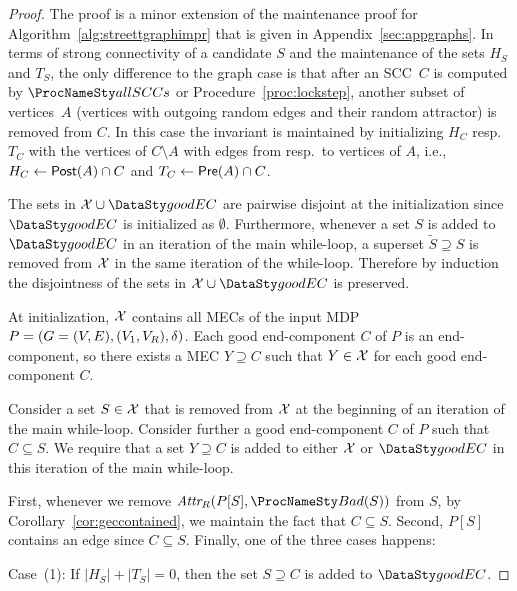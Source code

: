 \begin{proof}
\item 
\smallskip{}
The proof is a minor extension of the maintenance proof for Algorithm~\ref{alg:streettgraphimpr}
that is given in Appendix~\ref{sec:appgraphs}. In terms of strong connectivity of a candidate $S$
and the maintenance of the sets $H_S$ and $T_S$, the only difference to the graph case is that
after an SCC~$C$ is computed by $\sccalg$ or Procedure~\ref{proc:lockstep}, another subset
of vertices~$A$ (vertices with outgoing random edges and their random attractor) is removed
from $C$. In this case the invariant is maintained by initializing $H_C$ resp.\ $T_C$ with 
the vertices of $C \setminus A$ with edges from resp.\ to vertices of $A$, i.e., 
$H_C \gets \mathsf{Post}(A) \cap C$ and $T_C \gets \mathsf{Pre}(A) \cap C$.

\smallskip{}
The sets in $\mathcal{\ec} \cup \good$ are pairwise disjoint at the
initialization since $\good$ is initialized as $\emptyset$. Furthermore,
whenever a set $S$ is added to $\good$ in an iteration of the main
while-loop, a superset $\tilde{S} \supseteq S$ is removed from
$\mathcal{X}$ in the same iteration of the while-loop. Therefore
by induction the disjointness of the sets in $\mathcal{\ec} \cup \good$
is preserved.

\smallskip{}
At initialization, $\mathcal{X}$ contains all MECs of the input MDP
$P = (G = (V, E), \allowbreak(V_1, V_R), \allowbreak\delta)$.
Each good end-component $C$ of $P$ is an end-component, 
so there exists a MEC $Y \supseteq C$ such that $Y \in \mathcal{X}$
for each good end-component $C$.

Consider a set $S \in \mathcal{X}$ that is removed from $\mathcal{X}$
at the beginning of an iteration of the main while-loop. Consider further
a good end-component $C$ of $P$ such that $C \subseteq S$. We require that a set
$Y \supseteq C$ is added to either
$\mathcal{X}$ or $\good$ in this iteration of the main while-loop.

First, whenever we remove $\at{R}{\mdp[S]}{\bad(S)}$ from $S$, by Corollary~\ref{cor:geccontained},
we maintain the fact that $C \subseteq S$. Second, $P[S]$ contains an edge since $C \subseteq S$.
Finally, one of the three cases happens:

\smallskip\noindent Case~(1): If $\lvert H_S \rvert + \lvert T_S \rvert = 0$, then the set
$S \supseteq C$ is added to $\good$.


\end{proof}
